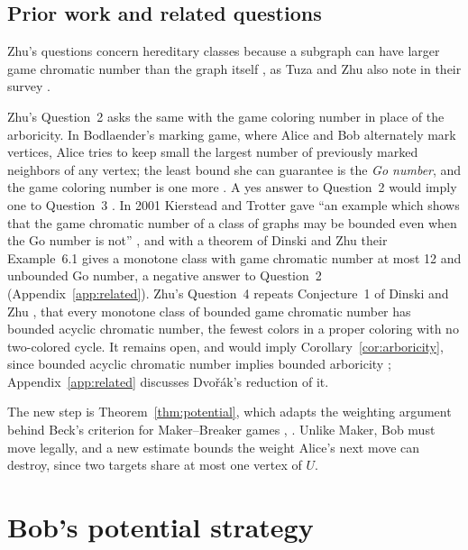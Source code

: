 \documentclass[11pt]{article}
\theoremstyle{remark}
\begin{document}
\subsection{Prior work and related questions}
Zhu's questions concern hereditary classes because a subgraph can have
larger game chromatic number than the graph itself \cite[p.~11]{Zhu}, as
Tuza and Zhu also note in their survey \cite[Section~1, p.~306]{TZ}.

Zhu's Question~2 asks the same with the game coloring number in place of
the arboricity. In Bodlaender's marking game, where Alice and Bob
alternately mark vertices, Alice tries to keep small the largest number of
previously marked neighbors of any vertex; the least bound she can
guarantee is the \emph{Go number}, and the game coloring number is one more
\cite[Section~2]{KT}. A yes answer to Question~2 would imply one to
Question~3 \cite[p.~12]{Zhu}. In 2001 Kierstead and Trotter gave ``an
example which shows that the game chromatic number of a class of graphs
may be bounded even when the Go number is not'' \cite[Section~6]{KT}, and
with a theorem of Dinski and Zhu
\cite[Theorem~2]{DZ} their Example~6.1 gives a monotone class with game
chromatic number at most 12 and unbounded Go number, a negative answer to
Question~2 (Appendix~\ref{app:related}). Zhu's Question~4 repeats
Conjecture~1 of Dinski and Zhu \cite{DZ}, that every monotone class of bounded game
chromatic number has bounded acyclic chromatic number, the fewest colors
in a proper coloring with no two-colored cycle. It remains open, and would
imply Corollary~\ref{cor:arboricity}, since bounded acyclic chromatic
number implies bounded arboricity \cite[p.~12]{Zhu}; Appendix~\ref{app:related}
discusses Dvořák's reduction of it.

The new step is Theorem~\ref{thm:potential}, which adapts the weighting
argument behind Beck's criterion for Maker--Breaker games \cite{Be},
\cite[Theorem~4.3]{Kr}. Unlike Maker, Bob must move legally, and a new
estimate bounds the weight Alice's next move can destroy, since two
targets share at most one vertex of $U$.


\section{Bob's potential strategy}\label{sec:potential}
\end{document}
